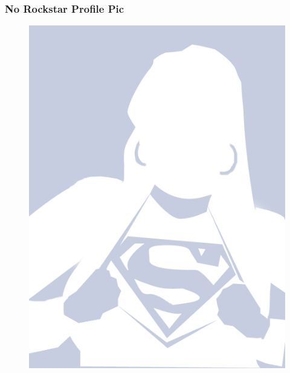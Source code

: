 \begin{frame}
	\frametitle{No Rockstar Profile Pic}
	\begin{figure}
		\includegraphics[scale=.3]{assets/rockstar}
	\end{figure}
\end{frame}

